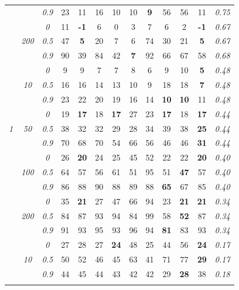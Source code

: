 \documentclass[12pt]{article}
\begin{document}
\begin{table}
\begin{center}
\begin{tabular}{ccc|cc|cc|cc|cc|c|c}
& & \it  0.9  & 23 & 11 & 16 & 10 & 10 & {\bf 9} & 56 & 56 & 11 & \it  0.75 \\[1ex]
\cline{2-3}\rule{0pt}{3ex}
& & \it  0  & 11 & {\bf -1} & 6 & 0 & 3 & 7 & 6 & 2 & {\bf -1} & \it  0.67 \\
 & \it  200  & \it  0.5  & 47 & {\bf 5} & 20 & 7 & 6 & 74 & 30 & 21 & {\bf 5} & \it  0.67 \\
& & \it  0.9  & 90 & 39 & 84 & 42 & {\bf 7} & 92 & 66 & 67 & 58 & \it  0.68 \\[1ex]
\cline{2-3}\hline\rule{0pt}{3ex}
& & \it  0  & 9 & 9 & 7 & 7 & 8 & 6 & 9 & 10 & {\bf 5} & \it  0.48 \\
 & \it  10  & \it  0.5  & 16 & 16 & 14 & 13 & 10 & 9 & 18 & 18 & {\bf 7} & \it  0.48 \\
& & \it  0.9  & 23 & 22 & 20 & 19 & 16 & 14 & {\bf 10} & {\bf 10} & 11 & \it  0.48 \\[1ex]
\cline{2-3}\rule{0pt}{3ex}
& & \it  0  & 19 & {\bf 17} & 18 & {\bf 17} & 27 & 23 & {\bf 17} & 18 & {\bf 17} & \it  0.44 \\
\it  1  & \it  50  & \it  0.5  & 38 & 32 & 32 & 29 & 28 & 34 & 39 & 38 & {\bf 25} & \it  0.44 \\
& & \it  0.9  & 70 & 68 & 70 & 54 & 66 & 56 & 46 & 46 & {\bf 31} & \it  0.44 \\[1ex]
\cline{2-3}\rule{0pt}{3ex}
& & \it  0  & 26 & {\bf 20} & 24 & 25 & 45 & 52 & 22 & 22 & {\bf 20} & \it  0.40 \\
 & \it  100  & \it  0.5  & 64 & 57 & 56 & 61 & 51 & 95 & 51 & {\bf 47} & 57 & \it  0.40 \\
& & \it  0.9  & 86 & 88 & 90 & 88 & 89 & 88 & {\bf 65} & 67 & 85 & \it  0.40 \\[1ex]
\cline{2-3}\rule{0pt}{3ex}
& & \it  0  & 35 & {\bf 21} & 27 & 47 & 66 & 94 & 23 & {\bf 21} & {\bf 21} & \it  0.34 \\
 & \it  200  & \it  0.5  & 84 & 87 & 93 & 94 & 84 & 99 & 58 & {\bf 52} & 87 & \it  0.34 \\
& & \it  0.9  & 91 & 93 & 95 & 93 & 96 & 94 & {\bf 81} & 83 & 93 & \it  0.34 \\[1ex]
\cline{2-3}\hline\rule{0pt}{3ex}
& & \it  0  & 27 & 28 & 27 & {\bf 24} & 48 & 25 & 44 & 56 & {\bf 24} & \it  0.17 \\
 & \it  10  & \it  0.5  & 50 & 52 & 46 & 45 & 63 & 41 & 71 & 77 & {\bf 29} & \it  0.17 \\
& & \it  0.9  & 44 & 45 & 44 & 43 & 42 & 42 & 29 & {\bf 28} & 38 & \it  0.18 \\[1ex]
\cline{2-3}\rule{0pt}{3ex}

\end{tabular}
\end{center}
\end{table}
\end{document}
